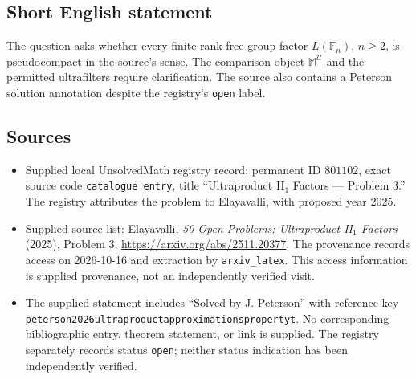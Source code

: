 \documentclass[11pt]{article}
\begin{document}
\subsection{Short English statement}
The question asks whether every finite-rank free group factor \(L(\mathbb F_n)\), \(n\geq 2\), is pseudocompact in the source's sense. The comparison object \(\mathbb M^{\mathcal U}\) and the permitted ultrafilters require clarification. The source also contains a Peterson solution annotation despite the registry's \texttt{open} label.
\subsection{Sources}
\begin{itemize}
\item Supplied local UnsolvedMath registry record: permanent ID \(801102\), exact source code \texttt{catalogue entry}, title ``Ultraproduct II\(_1\) Factors --- Problem 3.'' The registry attributes the problem to Elayavalli, with proposed year 2025.
\item Supplied source list: Elayavalli, \emph{50 Open Problems: Ultraproduct II\(_1\) Factors} (2025), Problem 3, \url{https://arxiv.org/abs/2511.20377}. The provenance records access on 2026-10-16 and extraction by \texttt{arxiv\_latex}. This access information is supplied provenance, not an independently verified visit.
\item The supplied statement includes ``Solved by J. Peterson'' with reference key \texttt{peterson2026ultraproductapproximationspropertyt}. No corresponding bibliographic entry, theorem statement, or link is supplied. The registry separately records status \texttt{open}; neither status indication has been independently verified.
\end{itemize}
\end{document}
